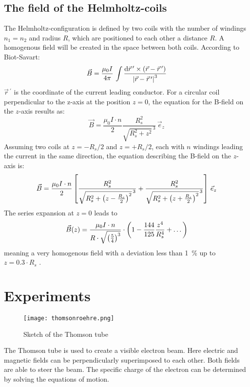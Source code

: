 \documentclass{tudphygp_eng}
\begin{document}
\subsection{The field of the Helmholtz-coils}
  The Helmholtz-configuration is defined by two coils with the number of windings $n_1 = n_2$ and radius $R$, which are positioned to each other a distance $R$. A homogenous field will be created in the space between both coils. 
	According to Biot-Savart:
  \begin{equation}
    \vec B = \frac{\mu_0 I}{4\pi}\,\int\limits\frac{\mathrm d\vec r\,^\prime \times \left(\vec r-\vec r\,^\prime\right)}
    {\left|\vec r-\vec r\,^\prime\right|^3}
  \end{equation}
  $\vec r\,^\prime$ is the coordinate of the current leading conductor. For a circular coil perpendicular to the z-axis at the position $z = 0$, the equation for the B-field on the $z$-axis results as:
  \begin{equation}
    \vec B = \frac{\mu_0 I\cdot n}{2}\frac{R_s^2}{\sqrt{R_s^2+z^2}^{\,3}}\,\vec e_z
  \end{equation}
  Assuming two coils at $z=-R_s/2$ and $z=+R_s/2$, each with $n$ windings leading the current in the same direction, the equation describing the B-field on the $z$-axis is:
  \begin{equation}
    \vec B = \frac{\mu_0 I\cdot n}{2}\left[\frac{R_s^2}{\sqrt{R_s^2+\left(z-\frac{R_s}{2}\right)^2}^{\,3}}+
    \frac{R_s^2}{\sqrt{R_s^2+\left(z+\frac{R_s}{2}\right)^2}^{\,3}}\right]\,\vec e_z
  \end{equation}
  The series expansion at $z=0$ leads to
  \begin{equation}
    \vec B(z) = \frac{\mu_0 I\cdot n}{R\cdot\sqrt{\left(\frac{5}{4}\right)^3}}\cdot\left(1-\frac{144}{125}\frac{z^4}{R_s^4}+\dots\right)
  \end{equation}
  meaning a very homogenous field with a deviation less than \SI{1}{\%} up to $z = \num{0.3}\cdot R_s$ .

\section{Experiments}
  \begin{figure}[h]
    \centering
    \texttt{[image: thomsonroehre.png]}
    \caption{Sketch of the Thomson tube}
  \end{figure}
  The Thomson tube is used to create a visible electron beam. Here electric and magnetic fields can be perpendicularly superimposed to each other. Both fields are able to steer the beam. The specific charge of the electron can be determined by solving the equations of motion.
  
\end{document}
